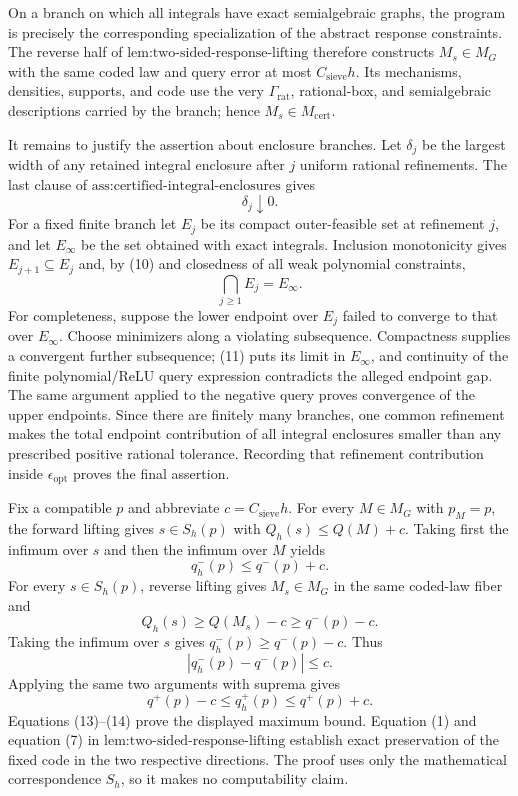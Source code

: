 On a branch on which all integrals have exact semialgebraic graphs, the program is precisely the corresponding specialization of the abstract response constraints.  The reverse half of \(\text{lem:two-sided-response-lifting}\) therefore constructs \(M_s\in M_G\) with the same coded law and query error at most \(C_{\mathrm{sieve}}h\).  Its mechanisms, densities, supports, and code use the very \(\Gamma_{\mathrm{rat}}\), rational-box, and semialgebraic descriptions carried by the branch; hence \(M_s\in M_{\mathrm{cert}}\).

It remains to justify the assertion about enclosure branches.  Let \(\delta_j\) be the largest width of any retained integral enclosure after \(j\) uniform rational refinements.  The last clause of \(\text{ass:certified-integral-enclosures}\) gives
\[
\delta_j\downarrow0.                                             \tag{10}
\]
For a fixed finite branch let \(E_j\) be its compact outer-feasible set at refinement \(j\), and let \(E_\infty\) be the set obtained with exact integrals.  Inclusion monotonicity gives \(E_{j+1}\subseteq E_j\) and, by (10) and closedness of all weak polynomial constraints,
\[
\bigcap_{j\geq1}E_j=E_\infty.                                   \tag{11}
\]
For completeness, suppose the lower endpoint over \(E_j\) failed to converge to that over \(E_\infty\).  Choose minimizers along a violating subsequence.  Compactness supplies a convergent further subsequence; (11) puts its limit in \(E_\infty\), and continuity of the finite polynomial/ReLU query expression contradicts the alleged endpoint gap.  The same argument applied to the negative query proves convergence of the upper endpoints.  Since there are finitely many branches, one common refinement makes the total endpoint contribution of all integral enclosures smaller than any prescribed positive rational tolerance.  Recording that refinement contribution inside \(\epsilon_{\mathrm{opt}}\) proves the final assertion.

Fix a compatible \(p\) and abbreviate \(c=C_{\mathrm{sieve}}h\).  For every \(M\in M_G\) with \(p_M=p\), the forward lifting gives \(s\in S_h(p)\) with \(Q_h(s)\leq Q(M)+c\).  Taking first the infimum over \(s\) and then the infimum over \(M\) yields
\[
q_h^-(p)\leq q^-(p)+c.                                           \tag{12}
\]
For every \(s\in S_h(p)\), reverse lifting gives \(M_s\in M_G\) in the same coded-law fiber and
\[
Q_h(s)\geq Q(M_s)-c\geq q^-(p)-c.
\]
Taking the infimum over \(s\) gives \(q_h^-(p)\geq q^-(p)-c\).  Thus
\[
|q_h^-(p)-q^-(p)|\leq c.                                         \tag{13}
\]
Applying the same two arguments with suprema gives
\[
q^+(p)-c\leq q_h^+(p)\leq q^+(p)+c.                             \tag{14}
\]
Equations (13)--(14) prove the displayed maximum bound.  Equation (1) and equation (7) in \(\text{lem:two-sided-response-lifting}\) establish exact preservation of the fixed code in the two respective directions.  The proof uses only the mathematical correspondence \(S_h\), so it makes no computability claim.

